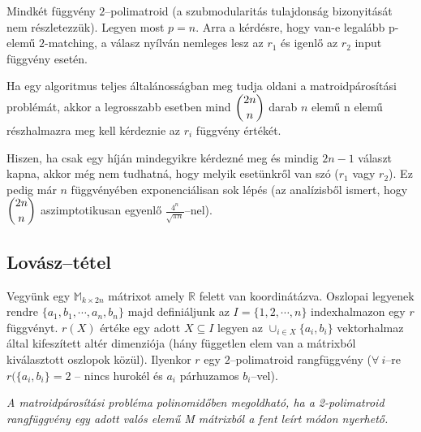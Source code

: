 Mindkét függvény $2$--polimatroid (a szubmodularitás tulajdonság bizonyitását
nem részletezzük). Legyen most $p=n$. Arra a kérdésre, hogy van-e legalább
p-elemű $2$-matching, a válasz nyílván nemleges lesz az $r_1$ és igenlő az $r_2$
input függvény esetén. 

Ha egy algoritmus teljes általánosságban meg tudja oldani a matroidpárosítási
problémát, akkor a legrosszabb esetben mind $\dbinom{2n}{n}$ darab $n$ elemű n
elemű részhalmazra meg kell kérdeznie az $r_i$ függvény értékét.

Hiszen, ha csak egy híján mindegyikre kérdezné meg és mindig $2n-1$ választ
kapna, akkor még nem tudhatná, hogy melyik esetünkről van szó ($r_1$ vagy
$r_2$). Ez pedig már $n$ függvényében exponenciálisan sok lépés (az analízisből
ismert, hogy $\dbinom{2n}{n}$ aszimptotikusan egyenlő $\frac{4^n}{\sqrt{\pi
n}}$--nel).

\subsection{Lovász--tétel}

Vegyünk egy $\mathbb{M}_{k \times 2n}$ mátrixot amely $\mathbb{R}$ felett van
koordinátázva. Oszlopai legyenek rendre $\{a_1, b_1, \cdots, a_n, b_n \}$ majd
definiáljunk az $I=\{1,2,\cdots,n\}$ indexhalmazon egy $r$ függvényt. $r(X)$
értéke egy adott $X\subseteq I$ legyen az $\cup_{i \in X}\{a_i, b_i\}$
vektorhalmaz által kifeszített altér dimenziója (hány független elem van a
mátrixból kiválasztott oszlopok közül). Ilyenkor $r$ egy $2$--polimatroid
rangfüggvény ($\forall~i$--re $r(\{a_i, b_i\}=2$ -- nincs hurokél és $a_i$
párhuzamos $b_i$--vel).

\vspace{0.4cm}
\emph{
A matroidpárosítási probléma polinomidőben megoldható, ha a 2-polimatroid
rangfüggvény egy adott valós elemű M mátrixból a fent leírt módon nyerhető.}